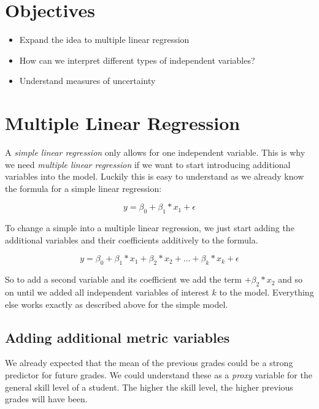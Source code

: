 \documentclass[
]{book}
\providecommand{\tightlist}{%
  \setlength{\itemsep}{0pt}\setlength{\parskip}{0pt}}
\begin{document}
\hypertarget{objectives-3}{%
\section{Objectives}\label{objectives-3}}

\begin{itemize}
\tightlist
\item
  Expand the idea to multiple linear regression
\item
  How can we interpret different types of independent variables?
\item
  Understand measures of uncertainty
\end{itemize}

\hypertarget{multiple-linear-regression}{%
\section{Multiple Linear Regression}\label{multiple-linear-regression}}

A \emph{simple linear regression} only allows for one independent variable. This is
why we need \emph{multiple linear regression} if we want to start introducing
additional variables into the model. Luckily this is easy to understand as we
already know the formula for a simple linear regression:

\[y = \beta_0 + \beta_1*x_1 + \epsilon\]

To change a simple into a multiple linear regression, we just start adding the
additional variables and their coefficients additively to the formula.

\[y = \beta_0 + \beta_1*x_1 + \beta_2*x_2 + ... + \beta_k*x_k + \epsilon\]

So to add a second variable and its coefficient we add the term \(+ \beta_2*x_2\)
and so on until we added all independent variables of interest \(k\) to the model.
Everything else works exactly as described above for the simple model.

\hypertarget{adding-additional-metric-variables}{%
\subsection{Adding additional metric variables}\label{adding-additional-metric-variables}}

We already expected that the mean of the previous grades could be a strong
predictor for future grades. We could understand these as a \emph{proxy} variable for
the general skill level of a student. The higher the skill level, the higher
previous grades will have been.
\end{document}
